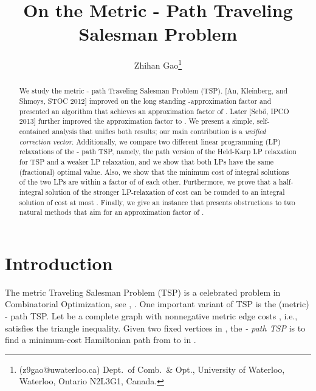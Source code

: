 \documentclass[11pt]{article}
\begin{document}
\title {On the Metric - Path Traveling Salesman Problem}
\author{
Zhihan Gao\thanks{
        (z9gao@uwaterloo.ca)
	Dept.\ of Comb.\ \& Opt.,
        University of Waterloo, Waterloo, Ontario N2L3G1, Canada.
	}
}


\date{}
\maketitle



\begin{abstract}
We study the metric - path Traveling Salesman Problem (TSP).
[An, Kleinberg, and Shmoys, STOC 2012] improved on
the long standing -approximation factor and
presented an algorithm that achieves an approximation factor of
.
Later [Seb\H{o}, IPCO 2013] further improved the approximation factor
to .
We present a simple, self-contained analysis that
unifies both results;
our main contribution is a \emph{unified correction vector}.
Additionally, we compare two different linear programming (LP) relaxations of
the - path TSP, namely,
the path version of the Held-Karp LP relaxation for TSP
and a weaker LP relaxation, and we show that both LPs have
the same (fractional) optimal value. Also, we show that the minimum cost of integral solutions of the
two LPs are within a factor of  of each other.
Furthermore, we prove that a half-integral solution of the stronger LP-relaxation of
cost  can be rounded to an integral solution of cost at most .
Finally, we give an instance that presents obstructions to
two natural methods that aim for an approximation factor of .
\end{abstract}




\section{Introduction}

The metric Traveling Salesman Problem (TSP) is a celebrated
problem in Combinatorial Optimization, see \cite[Chapter 58]{Sch03}, \cite{BB08}. One important variant of TSP
is the (metric) - path TSP. Let  be a complete graph  with
nonnegative metric edge costs , i.e.,  satisfies the triangle inequality.
Given two fixed vertices  in , the
\emph{- path TSP} is to find a minimum-cost Hamiltonian path
from  to  in .
\end{document}

